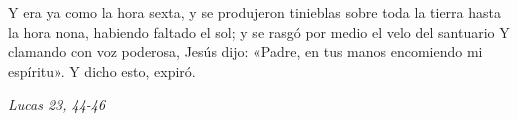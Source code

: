 \documentclass[../../devocionario.tex]{subfiles}
\begin{document}
    Y era ya como la hora sexta, y se produjeron tinieblas sobre toda la tierra hasta la hora nona, 
    habiendo faltado el sol; y se rasgó por medio el velo del santuario Y clamando con voz poderosa, 
    Jesús dijo: «Padre, en tus manos encomiendo mi espíritu». Y dicho esto, expiró.

    \begin{flushright}
        \emph{Lucas 23, 44-46}
    \end{flushright}
\end{document}
